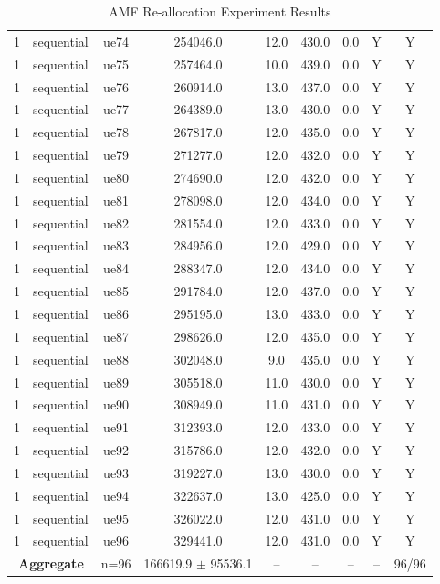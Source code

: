 \begin{table}[ht]
\begin{tabular}{|c|c|c|c|c|c|c|c|c|}
1 & sequential & ue74 & 254046.0 & 12.0 & 430.0 & 0.0 & Y & Y \\
1 & sequential & ue75 & 257464.0 & 10.0 & 439.0 & 0.0 & Y & Y \\
1 & sequential & ue76 & 260914.0 & 13.0 & 437.0 & 0.0 & Y & Y \\
1 & sequential & ue77 & 264389.0 & 13.0 & 430.0 & 0.0 & Y & Y \\
1 & sequential & ue78 & 267817.0 & 12.0 & 435.0 & 0.0 & Y & Y \\
1 & sequential & ue79 & 271277.0 & 12.0 & 432.0 & 0.0 & Y & Y \\
1 & sequential & ue80 & 274690.0 & 12.0 & 432.0 & 0.0 & Y & Y \\
1 & sequential & ue81 & 278098.0 & 12.0 & 434.0 & 0.0 & Y & Y \\
1 & sequential & ue82 & 281554.0 & 12.0 & 433.0 & 0.0 & Y & Y \\
1 & sequential & ue83 & 284956.0 & 12.0 & 429.0 & 0.0 & Y & Y \\
1 & sequential & ue84 & 288347.0 & 12.0 & 434.0 & 0.0 & Y & Y \\
1 & sequential & ue85 & 291784.0 & 12.0 & 437.0 & 0.0 & Y & Y \\
1 & sequential & ue86 & 295195.0 & 13.0 & 433.0 & 0.0 & Y & Y \\
1 & sequential & ue87 & 298626.0 & 12.0 & 435.0 & 0.0 & Y & Y \\
1 & sequential & ue88 & 302048.0 & 9.0 & 435.0 & 0.0 & Y & Y \\
1 & sequential & ue89 & 305518.0 & 11.0 & 430.0 & 0.0 & Y & Y \\
1 & sequential & ue90 & 308949.0 & 11.0 & 431.0 & 0.0 & Y & Y \\
1 & sequential & ue91 & 312393.0 & 12.0 & 433.0 & 0.0 & Y & Y \\
1 & sequential & ue92 & 315786.0 & 12.0 & 432.0 & 0.0 & Y & Y \\
1 & sequential & ue93 & 319227.0 & 13.0 & 430.0 & 0.0 & Y & Y \\
1 & sequential & ue94 & 322637.0 & 13.0 & 425.0 & 0.0 & Y & Y \\
1 & sequential & ue95 & 326022.0 & 12.0 & 431.0 & 0.0 & Y & Y \\
1 & sequential & ue96 & 329441.0 & 12.0 & 431.0 & 0.0 & Y & Y \\
\multicolumn{2}{|c|}{\textbf{Aggregate}} & n=96 & 166619.9 $\pm$ 95536.1 & -- & -- & -- & -- & 96/96 \\
\hline
\end{tabular}
\caption{AMF Re-allocation Experiment Results}
\label{tab:amf_realloc}
\end{table}
